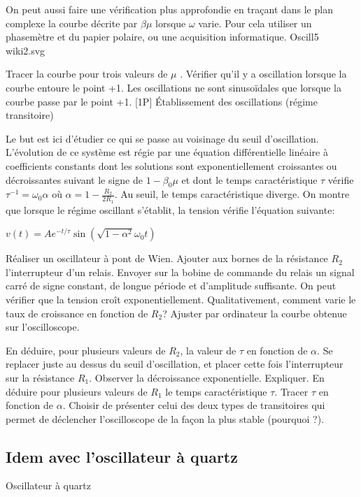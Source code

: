 \documentclass{article}%
\begin{document}
On peut aussi faire une vérification plus approfondie en traçant dans le plan complexe la courbe décrite par $\beta \mu$ lorsque $\omega$ varie. Pour cela utiliser un phasemètre et du papier polaire, ou une acquisition informatique.
Oscill5 wiki2.svg

Tracer la courbe pour trois valeurs de $\mu$ . Vérifier qu'il y a oscillation lorsque la courbe entoure le point +1. Les oscillations ne sont sinusoïdales que lorsque la courbe passe par le point +1.
[1P] Établissement des oscillations (régime transitoire)

Le but est ici d'étudier ce qui se passe au voisinage du seuil d'oscillation. L'évolution de ce système est régie par une équation différentielle linéaire à coefficients constants dont les solutions sont exponentiellement croissantes ou décroissantes suivant le signe de $1-\beta_0 \mu$ et dont le temps caractéristique $\tau$ vérifie $\tau^{-1}=\omega_0 \alpha$ où $\alpha= 1-\frac{R_2}{2 R_1 }$. Au seuil, le temps caractéristique diverge. On montre que lorsque le régime oscillant s'établit, la tension vérifie l'équation suivante:

 $ v(t)= A e^{-t/\tau} \sin\left(\sqrt{1-\alpha^2} \omega_0 t\right) $

Réaliser un oscillateur à pont de Wien. Ajouter aux bornes de la résistance $R_{2}$ l'interrupteur d'un relais. Envoyer sur la bobine de commande du relais un signal carré de signe constant, de longue période et d'amplitude suffisante. On peut vérifier que la tension croît exponentiellement. Qualitativement, comment varie le taux de croissance en fonction de $R_{2}$? Ajuster par ordinateur la courbe obtenue sur l'oscilloscope.

En déduire, pour plusieurs valeurs de $R_{2}$, la valeur de $\tau$ en fonction de $\alpha$. Se replacer juste au dessus du seuil d'oscillation, et placer cette fois l'interrupteur sur la résistance $R_{1}$. Observer la décroissance exponentielle. Expliquer. En déduire pour plusieurs valeurs de $R_{1}$ le temps caractéristique $\tau$. Tracer $\tau$ en fonction de $\alpha$. Choisir de présenter celui des deux types de transitoires qui permet de déclencher l'oscilloscope de la façon la plus stable (pourquoi ?).


\subsection{Idem avec l'oscillateur à quartz}

Oscillateur à quartz
\end{document}
